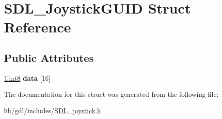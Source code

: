 \hypertarget{struct_s_d_l___joystick_g_u_i_d}{}\section{S\+D\+L\+\_\+\+Joystick\+G\+U\+I\+D Struct Reference}
\label{struct_s_d_l___joystick_g_u_i_d}
\subsection*{Public Attributes}
\begin{DoxyCompactItemize}
\item 
\hypertarget{struct_s_d_l___joystick_g_u_i_d_a16935b928a608fe98e0509f242590597}{}\hyperlink{_s_d_l__stdinc_8h_a2944638813a090aa23e62f4da842c3e2}{Uint8} {\bfseries data} \mbox{[}16\mbox{]}\label{struct_s_d_l___joystick_g_u_i_d_a16935b928a608fe98e0509f242590597}

\end{DoxyCompactItemize}


The documentation for this struct was generated from the following file\+:\begin{DoxyCompactItemize}
\item 
lib/gdl/includes/\hyperlink{_s_d_l__joystick_8h}{S\+D\+L\+\_\+joystick.\+h}\end{DoxyCompactItemize}
